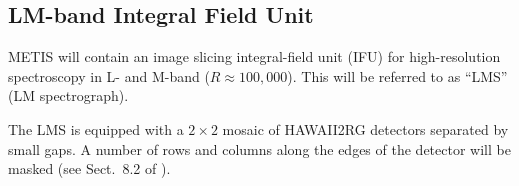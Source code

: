 

\subsection{LM-band Integral Field Unit}
\label{ssec:instrument_data_LMS}

METIS will contain an image slicing integral-field unit (IFU) for
high-resolution spectroscopy in L- and M-band ($R\approx
100,000$). This will be referred to as ``LMS'' (LM spectrograph).

The LMS is equipped with a $2\times2$ mosaic of HAWAII2RG detectors
separated by small gaps. A number of rows and columns along the edges
of the detector will be masked (see Sect.~8.2 of \cite{DRLS}).

